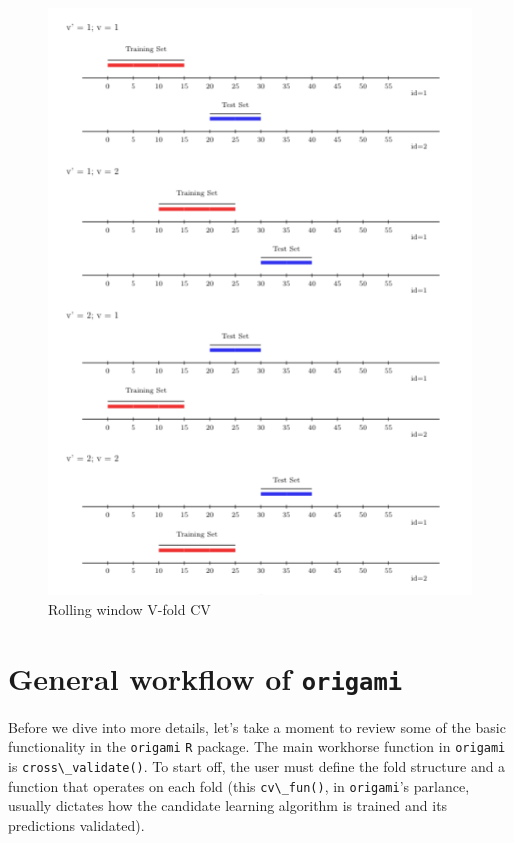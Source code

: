 \documentclass[
  12pt, krantz2,
]{krantz}
\newcommand{\passthrough}[1]{#1}
\newcommand{\1}{\mathbbm{1}}
\theoremstyle{definition}
\theoremstyle{definition}
\theoremstyle{definition}
\theoremstyle{definition}
\theoremstyle{remark}
\begin{document}
\begin{figure}

{\centering \includegraphics[width=0.8\linewidth]{img/png/rolling_window_v_fold} 

}

\caption{Rolling window V-fold CV}\label{fig:unnamed-chunk-4}
\end{figure}

\hypertarget{general-workflow-of-origami}{%
\section{\texorpdfstring{General workflow of \texttt{origami}}{General workflow of origami}}\label{general-workflow-of-origami}}

Before we dive into more details, let's take a moment to review some of the
basic functionality in the \passthrough{\lstinline!origami!} \passthrough{\lstinline!R!} package. The main workhorse function in
\passthrough{\lstinline!origami!} is \passthrough{\lstinline!cross\_validate()!}. To start off, the user must define the fold
structure and a function that operates on each fold (this \passthrough{\lstinline!cv\_fun()!}, in
\passthrough{\lstinline!origami!}'s parlance, usually dictates how the candidate learning algorithm is
trained and its predictions validated).
\end{document}
